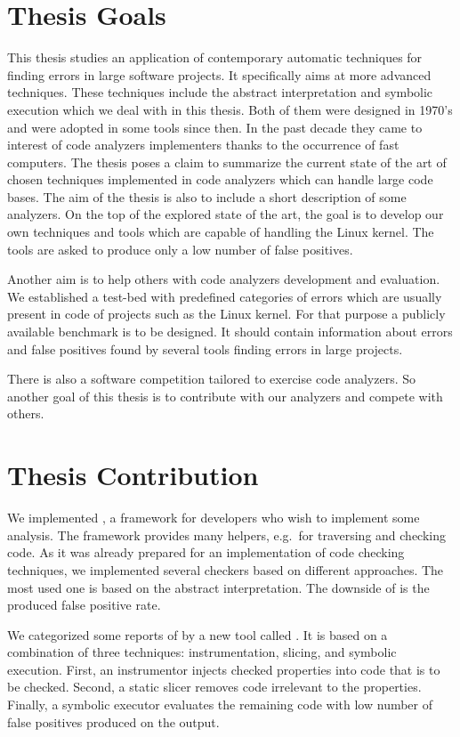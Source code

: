 \section{Thesis Goals}
This thesis studies an application of contemporary automatic techniques for
finding errors in large software projects. It specifically aims at more
advanced techniques. These techniques include the abstract interpretation and
symbolic execution which we deal with in this thesis. Both of them were
designed in 1970's and were adopted in some tools since then. In the past
decade they came to interest of code analyzers implementers thanks to the
occurrence of fast computers. The thesis poses a claim to summarize the
current state of the art of chosen techniques implemented in code analyzers
which can handle large code bases. The aim of the thesis is also to include a
short description of some analyzers. On the top of the explored state of
the art, the goal is to develop our own techniques and tools which are capable
of handling the Linux kernel.  The tools are asked to produce only a low
number of false positives.

Another aim is to help others with code analyzers development and evaluation.
We established a test-bed with predefined categories of errors which are
usually present in code of projects such as the Linux kernel. For that purpose
a publicly available benchmark is to be designed. It should contain
information about errors and false positives found by several tools finding
errors in large projects.

There is also a software competition tailored to exercise code analyzers. So
another goal of this thesis is to contribute with our analyzers and compete
with others.

\section{Thesis Contribution}
We implemented \stan, a framework for developers who wish to implement some
analysis. The framework provides many helpers, e.g.\ for traversing and
checking code. As it was already prepared for an implementation of code
checking techniques, we implemented several checkers based on different
approaches. The most used one is based on the abstract interpretation. The
downside of \stan is the produced false positive rate.

We categorized some reports of \stan by a new tool called \symbio. It is based
on a combination of three techniques: instrumentation, slicing, and symbolic
execution.  First, an instrumentor injects checked properties into code that
is to be checked. Second, a static slicer removes code irrelevant to the
properties.  Finally, a symbolic executor evaluates the remaining code with
low number of false positives produced on the output.

